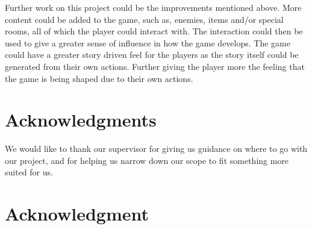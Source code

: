 \documentclass[conference,compsoc]{IEEEtran}
\begin{document}
Further work on this project could be the improvements mentioned above. More content could be added to the game, such as, enemies, items and/or special rooms, all of which the player could interact with. The interaction could then be used to give a greater sense of influence in how the game develops. 
The game could have a greater story driven feel for the players as the story itself could be generated from their own actions. 
Further giving the player more the feeling that the game is being shaped due to their own actions.



\ifCLASSOPTIONcompsoc
  \section*{Acknowledgments}
  We would like to thank our supervisor for giving us guidance on where to go with our project, and for helping us narrow down our scope to fit something more suited for us.
\else
  \section*{Acknowledgment}
\fi




\end{document}
